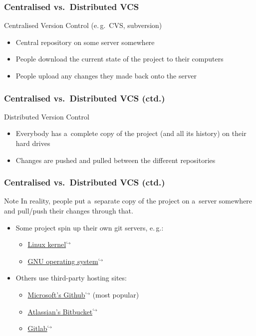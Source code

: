 \documentclass[12pt]{beamer}
\begin{document}
\begin{frame}
  \frametitle{Centralised vs.\ Distributed VCS}

  \begin{block}{Centralised Version Control (e.\,g.\ CVS, subversion)}
    \begin{itemize}
      \item Central repository on some server somewhere
      \item People download the current state of the project to their computers
      \item People upload any changes they made back onto the server
    \end{itemize}
  \end{block}
\end{frame}

\begin{frame}
  \frametitle{Centralised vs.\ Distributed VCS (ctd.)}

  \begin{block}{Distributed Version Control}
    \begin{itemize}
      \item Everybody has a~complete copy of the project (and all its history)
        on their hard drives
      \item Changes are pushed and pulled between the different repositories
    \end{itemize}
  \end{block}
\end{frame}

\begin{frame}
  \frametitle{Centralised vs.\ Distributed VCS (ctd.)}

  \begin{block}{Note}
    In reality, people put a~separate copy of the project on a~server somewhere
    and pull/push their changes through that.
    \begin{itemize}
      \item Some project spin up their own git servers, e.\,g.:
        \begin{itemize}
          \item \href{https://git.kernel.org/}{Linux kernel$^{\hookrightarrow}$}
          \item \href{https://savannah.gnu.org/}{GNU operating system$^{\hookrightarrow}$}
        \end{itemize}
      \item Others use third-party hosting sites:
        \begin{itemize}
          \item \href{https://github.com}{Microsoft's Github$^{\hookrightarrow}$}
            (most popular)
          \item \href{https://bitbucket.org}{Atlassian's Bitbucket$^{\hookrightarrow}$}
          \item \href{https://about.gitlab.com}{Gitlab$^{\hookrightarrow}$}
        \end{itemize}
    \end{itemize}
  \end{block}
\end{frame}
\end{document}
